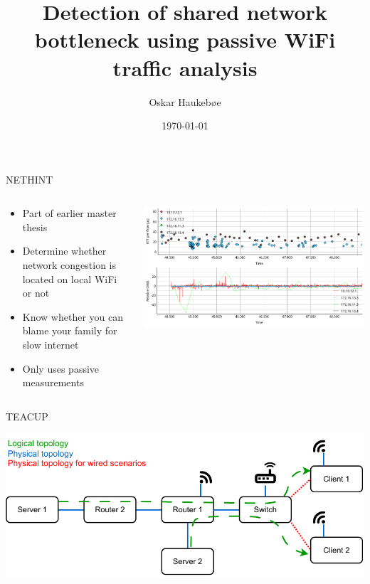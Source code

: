 \documentclass[presentation]{beamer}
\author{Oskar Haukebøe}
\date{\today}
\title{Detection of shared network bottleneck using passive WiFi traffic analysis}
\begin{document}
\maketitle

\begin{frame}[label={sec:orgc0699d8}]{NETHINT}
\begin{columns}
\begin{column}{0.48\columnwidth}
\begin{itemize}[<+->]
\item Part of earlier master thesis
\item Determine whether network congestion is located on local WiFi or not
\item Know whether you can blame your family for slow internet
\item Only uses passive measurements
\end{itemize}
\end{column}
\begin{column}{0.7\columnwidth}
\begin{center}
\includegraphics[width=.9\linewidth]{figures/nethint.png}
\end{center}
\end{column}
\end{columns}
\end{frame}
\begin{frame}[label={sec:org0419901}]{TEACUP}
\pause

\begin{center}
\includegraphics[width=.9\linewidth]{figures/topology-wireless.drawio-1.pdf}
\end{center}
\end{frame}
\end{document}
